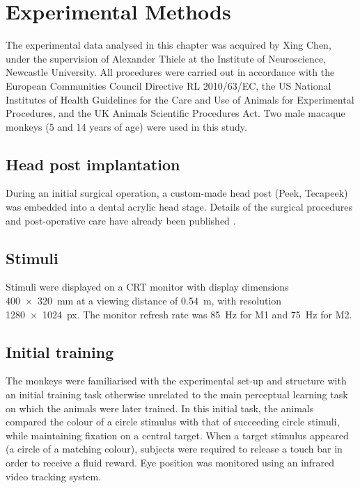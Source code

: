 \section{Experimental Methods}
\label{ch:exp}

The experimental data analysed in this chapter was acquired by Xing Chen, under the supervision of Alexander Thiele at the Institute of Neuroscience, Newcastle University.
All procedures were carried out in accordance with the European Communities Council Directive RL 2010/63/EC, the US National Institutes of Health Guidelines for the Care and Use of Animals for Experimental Procedures, and the UK Animals Scientific Procedures Act. Two male macaque monkeys (5 and 14 years of age) were used in this study.


\subsection{Head post implantation}

During an initial surgical operation, a custom-made head post (Peek, Tecapeek) was embedded into a dental acrylic head stage.
Details of the surgical procedures and post-operative care have already been published \citep[see][]{Thiele2006}.


\subsection{Stimuli}

Stimuli were displayed on a \ac{CRT} monitor with display dimensions \SI{400x320}{\milli\metre} at a viewing distance of \SI{0.54}{\metre}, with resolution \SI{1280x1024}{px}.
The monitor refresh rate was \SI{85}{Hz} for \ac{M1} and \SI{75}{Hz} for \ac{M2}.


\subsection{Initial training}

The monkeys were familiarised with the experimental set-up and structure with an initial training task otherwise unrelated to the main perceptual learning task on which the animals were later trained.
In this initial task, the animals compared the colour of a circle stimulus with that of succeeding circle stimuli, while maintaining fixation on a central target.
When a target stimulus appeared (a circle of a matching colour), subjects were required to release a touch bar in order to receive a fluid reward.
Eye position was monitored using an infrared video tracking system.%



